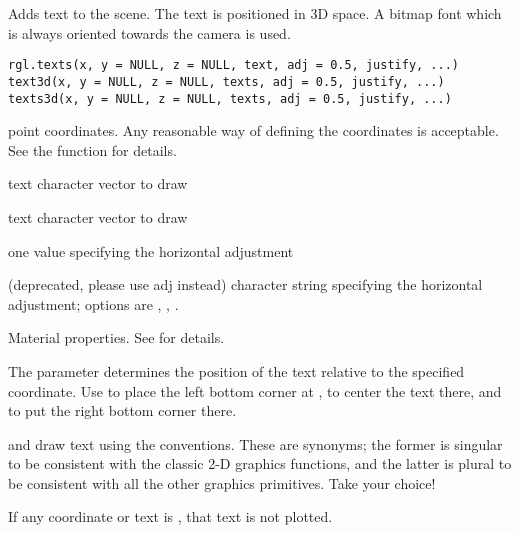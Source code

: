 \begin{Description}\relax
Adds text to the scene. The text is positioned in 3D space. 
A bitmap font which is always oriented towards the camera is used.
\end{Description}
\begin{Usage}
\begin{verbatim}
rgl.texts(x, y = NULL, z = NULL, text, adj = 0.5, justify, ...)
text3d(x, y = NULL, z = NULL, texts, adj = 0.5, justify, ...) 
texts3d(x, y = NULL, z = NULL, texts, adj = 0.5, justify, ...) 
\end{verbatim}
\end{Usage}
\begin{Arguments}
\begin{ldescription}
\item[\code{x, y, z}] point coordinates.  Any reasonable way of defining the
coordinates is acceptable.  See the function 
for details.
\item[\code{text}] text character vector to draw
\item[\code{texts}] text character vector to draw
\item[\code{adj}] one value specifying the horizontal adjustment 
\item[\code{justify}] (deprecated, please use adj instead) character string
specifying the horizontal adjustment; options are , ,
.

\item[\code{ ... }] Material properties. See  for details.
\end{ldescription}
\end{Arguments}
\begin{Details}\relax
The  parameter determines the position of the text relative to the 
specified coordinate.  Use  to place the left bottom corner at
,  to center the text there, and 
to put the right bottom corner there.

 and  draw text using the 
conventions. These are synonyms; the former is singular to be
consistent with the classic 2-D graphics functions, and the latter is
plural to be consistent with all the other graphics primitives.  Take
your choice!

If any coordinate or text is , that text is not plotted.
\end{Details}
